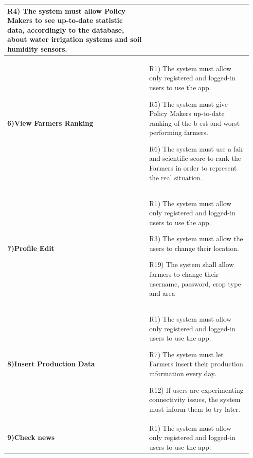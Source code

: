 \documentclass[table, 12pt]{article}
\begin{document}
\begin{itemize}
\begin{longtable}{|p{}|p{}|}
                                                                                                                             R4) The system must allow Policy Makers to see up-to-date statistic data, accordingly to the database, about water irrigation systems and soil humidity sensors.\\\hline
                    
                    \cellcolor{SpringGreen!50}\textbf{6)View Farmers Ranking}\centering &  R1) The system must allow only registered and logged-in users to use the app.

                                                                                 R5) The system must give Policy Makers up-to-date ranking of the b est and worst performing farmers.

                                                                                 R6) The system must use a fair and scientific score to rank the Farmers in order to represent the real situation.\\\hline
                    \cellcolor{SpringGreen!50}\textbf{7)Profile Edit}\centering &  R1) The system must allow only registered and logged-in users to use the app.

                                                                         R3) The system must allow the users to change their location.
                    
                                                                         R19) The system shall allow farmers to change their username, password, crop type and area\\\hline
                    \cellcolor{SpringGreen!50}\textbf{8)Insert Production Data}\centering & R1) The system must allow only registered and logged-in users to use the app.

                                                                                  R7) The system must let Farmers insert their production information every day.
                                                                                  
                                                                                  R12) If users are experimenting connectivity issues, the system must inform them to try later.\\\hline
                    \cellcolor{SpringGreen!50}\textbf{9)Check news}\centering &  R1) The system must allow only registered and logged-in users to use the app.
                                                                       

\end{longtable}
\end{itemize}
\end{document}
